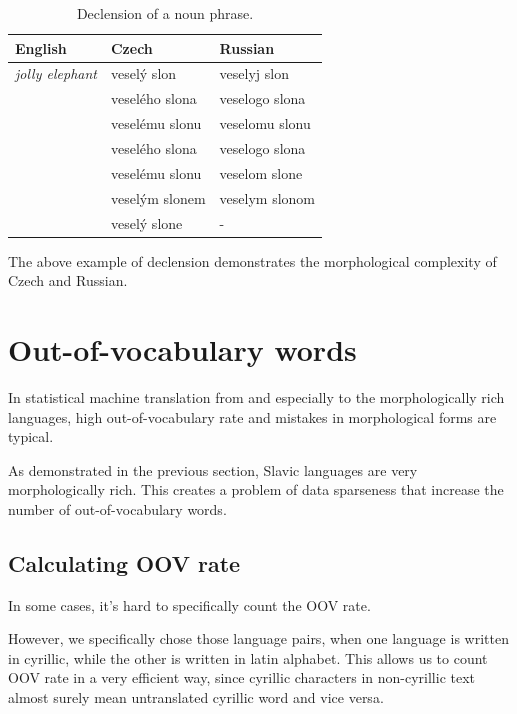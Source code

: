 \documentclass[11pt,letterpaper]{article}
\begin{document}
\begin{table}
\begin{center}
\begin{tabular}{|l|l|l|}
\hline
English & Czech & Russian \\ \hline
\textit{jolly elephant} & veselý slon & veselyj slon \\
 & veselého slona & veselogo slona \\
 & veselému slonu & veselomu slonu \\
 & veselého slona & veselogo slona \\ 
 & veselému slonu & veselom slone\\
 & veselým slonem& veselym slonom\\
 & veselý slone & - \\ %
\hline
\end{tabular}
\end{center}
\caption{Declension of a noun phrase.}
\label{tab:slon}
\end{table}

The above example of declension demonstrates the morphological complexity of Czech and Russian.

\section{Out-of-vocabulary words}
In statistical machine translation from and especially to the morphologically rich languages,
high out-of-vocabulary rate and mistakes in morphological forms are typical.

As demonstrated in the previous section, Slavic languages are very morphologically rich. This creates a problem of data sparseness that increase the number of out-of-vocabulary words.

\subsection{Calculating OOV rate}
In some cases, it's hard to specifically count the OOV rate.

However, we specifically chose those language pairs, when one language is written in cyrillic, while the other is written in latin alphabet. This allows us to count OOV rate in a very efficient way, since cyrillic characters in non-cyrillic text almost surely mean untranslated cyrillic word and vice versa.
\end{document}
